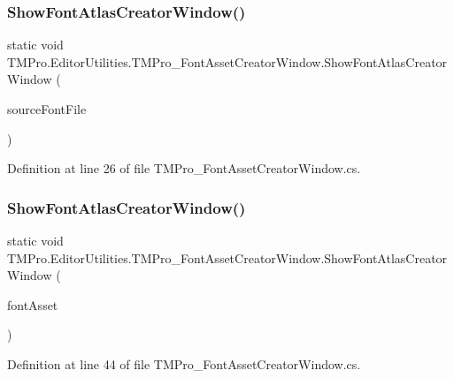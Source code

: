 \subsubsection{\texorpdfstring{ShowFontAtlasCreatorWindow()}{ShowFontAtlasCreatorWindow()}\hspace{0.1cm}{\footnotesize\ttfamily [2/3]}}
{\footnotesize\ttfamily static void T\+M\+Pro.\+Editor\+Utilities.\+T\+M\+Pro\+\_\+\+Font\+Asset\+Creator\+Window.\+Show\+Font\+Atlas\+Creator\+Window (\begin{DoxyParamCaption}\item[{Font}]{source\+Font\+File }\end{DoxyParamCaption})\hspace{0.3cm}{\ttfamily [static]}}



Definition at line 26 of file T\+M\+Pro\+\_\+\+Font\+Asset\+Creator\+Window.\+cs.

\mbox{\label{class_t_m_pro_1_1_editor_utilities_1_1_t_m_pro___font_asset_creator_window_a9e0ed45f56fa9d4b78c563be37ad3106}} 
\subsubsection{\texorpdfstring{ShowFontAtlasCreatorWindow()}{ShowFontAtlasCreatorWindow()}\hspace{0.1cm}{\footnotesize\ttfamily [3/3]}}
{\footnotesize\ttfamily static void T\+M\+Pro.\+Editor\+Utilities.\+T\+M\+Pro\+\_\+\+Font\+Asset\+Creator\+Window.\+Show\+Font\+Atlas\+Creator\+Window (\begin{DoxyParamCaption}\item[{\mbox{\hyperlink{class_t_m_pro_1_1_t_m_p___font_asset}{T\+M\+P\+\_\+\+Font\+Asset}}}]{font\+Asset }\end{DoxyParamCaption})\hspace{0.3cm}{\ttfamily [static]}}



Definition at line 44 of file T\+M\+Pro\+\_\+\+Font\+Asset\+Creator\+Window.\+cs.

